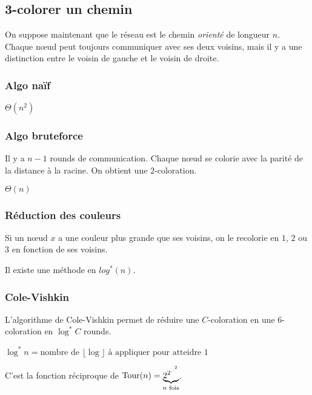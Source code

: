 \subsection{3-colorer un chemin}

On suppose maintenant que le réseau est le chemin \emph{orienté} de longueur $n$. Chaque nœud peut toujours communiquer avec ses deux voisins, mais il y a une distinction entre le voisin de gauche et le voisin de droite.

\subsubsection{Algo naïf}

\begin{complexite}
	$\Theta(n^2)$
\end{complexite}

\subsubsection{Algo bruteforce}

Il y a $n - 1$ rounds de communication. Chaque nœud se colorie avec la parité de la distance à la racine. On obtient une $2$-coloration.

\begin{complexite}
	$\Theta(n)$
\end{complexite}

\subsubsection{Réduction des couleurs}

Si un nœud $x$ a une couleur plus grande que ses voisins, on le recolorie en $1$, $2$ ou $3$ en fonction de ses voisins.

Il existe une méthode en $log^*(n)$.

\subsubsection{Cole-Vishkin}

L'algorithme de Cole-Vishkin permet de réduire une $C$-coloration en une 6-coloration en $\log^* C$ rounds.

\begin{note}
	$\log^* n = \text{nombre de } \lfloor \log \rfloor \text{ à appliquer pour atteidre } 1$
	
	C'est la fonction réciproque de $\operatorname{Tour}(n) = \underbrace{2^{2^{.^{.^2}}}}_{n \text{ fois}}$.
\end{note}

